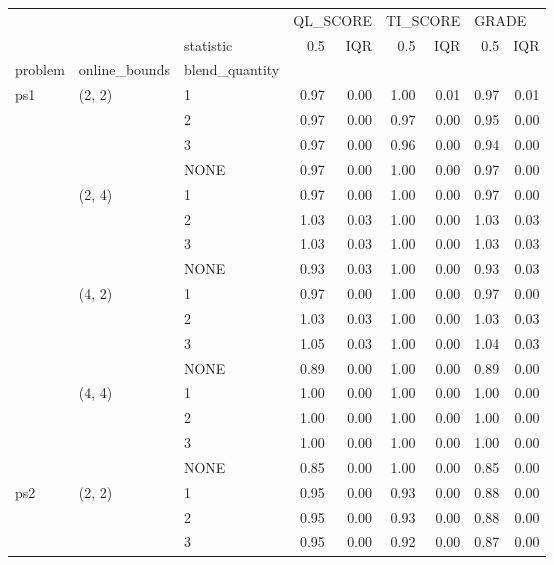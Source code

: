 \begin{tabular}{lllrrrrrr}
\toprule
    &        & {} & \multicolumn{2}{l}{QL\_SCORE} & \multicolumn{2}{l}{TI\_SCORE} & \multicolumn{2}{l}{GRADE} \\
    &        & statistic &      0.5 &  IQR &      0.5 &  IQR &   0.5 &  IQR \\
problem & online\_bounds & blend\_quantity &          &      &          &      &       &      \\
\midrule
ps1 & (2, 2) & 1 &     0.97 & 0.00 &     1.00 & 0.01 &  0.97 & 0.01 \\
    &        & 2 &     0.97 & 0.00 &     0.97 & 0.00 &  0.95 & 0.00 \\
    &        & 3 &     0.97 & 0.00 &     0.96 & 0.00 &  0.94 & 0.00 \\
    &        & NONE &     0.97 & 0.00 &     1.00 & 0.00 &  0.97 & 0.00 \\
    & (2, 4) & 1 &     0.97 & 0.00 &     1.00 & 0.00 &  0.97 & 0.00 \\
    &        & 2 &     1.03 & 0.03 &     1.00 & 0.00 &  1.03 & 0.03 \\
    &        & 3 &     1.03 & 0.03 &     1.00 & 0.00 &  1.03 & 0.03 \\
    &        & NONE &     0.93 & 0.03 &     1.00 & 0.00 &  0.93 & 0.03 \\
    & (4, 2) & 1 &     0.97 & 0.00 &     1.00 & 0.00 &  0.97 & 0.00 \\
    &        & 2 &     1.03 & 0.03 &     1.00 & 0.00 &  1.03 & 0.03 \\
    &        & 3 &     1.05 & 0.03 &     1.00 & 0.00 &  1.04 & 0.03 \\
    &        & NONE &     0.89 & 0.00 &     1.00 & 0.00 &  0.89 & 0.00 \\
    & (4, 4) & 1 &     1.00 & 0.00 &     1.00 & 0.00 &  1.00 & 0.00 \\
    &        & 2 &     1.00 & 0.00 &     1.00 & 0.00 &  1.00 & 0.00 \\
    &        & 3 &     1.00 & 0.00 &     1.00 & 0.00 &  1.00 & 0.00 \\
    &        & NONE &     0.85 & 0.00 &     1.00 & 0.00 &  0.85 & 0.00 \\
ps2 & (2, 2) & 1 &     0.95 & 0.00 &     0.93 & 0.00 &  0.88 & 0.00 \\
    &        & 2 &     0.95 & 0.00 &     0.93 & 0.00 &  0.88 & 0.00 \\
    &        & 3 &     0.95 & 0.00 &     0.92 & 0.00 &  0.87 & 0.00 \\

\end{tabular}
